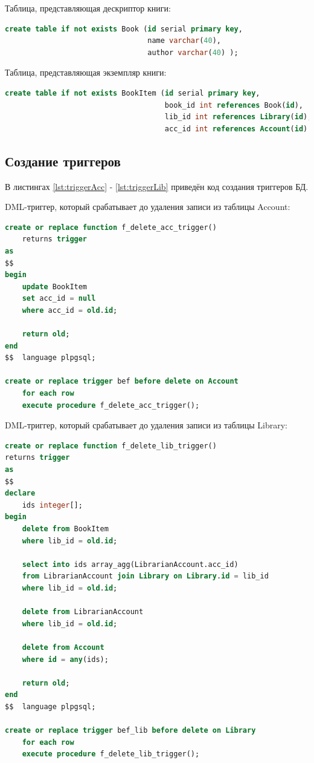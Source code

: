 Таблица, представляющая дескриптор книги:
\begin{lstlisting}[label=lst:tableBook, caption=Создание таблицы Book, language=sql]
create table if not exists Book (id serial primary key,
                                 name varchar(40),
                                 author varchar(40) );
\end{lstlisting}

Таблица, представляющая экземпляр книги:
\begin{lstlisting}[label=lst:tableBI, caption=Создание таблицы BookItem, language=sql]
create table if not exists BookItem (id serial primary key,
                                     book_id int references Book(id),
                                     lib_id int references Library(id),
                                     acc_id int references Account(id) );
\end{lstlisting}

\newpage
\subsection{Создание триггеров}
В листингах \ref{lst:triggerAcc} - \ref{lst:triggerLib} приведён код создания триггеров БД. 

\noindent DML-триггер, который срабатывает до удаления записи из таблицы Account:
\begin{lstlisting}[label=lst:triggerAcc, caption=Создание триггера (до удаления аккаунта), language=sql]
create or replace function f_delete_acc_trigger()
    returns trigger
as
$$
begin
    update BookItem
    set acc_id = null
    where acc_id = old.id;
    
    return old;
end
$$  language plpgsql;

create or replace trigger bef before delete on Account
    for each row
    execute procedure f_delete_acc_trigger();
\end{lstlisting}

\noindent DML-триггер, который срабатывает до удаления записи из таблицы Library:
\begin{lstlisting}[label=lst:triggerLib, caption=Создание триггера (до удаления библиотеки), language=sql]
create or replace function f_delete_lib_trigger()
returns trigger
as
$$
declare
    ids integer[];
begin
    delete from BookItem
    where lib_id = old.id;

    select into ids array_agg(LibrarianAccount.acc_id)
    from LibrarianAccount join Library on Library.id = lib_id
    where lib_id = old.id;

    delete from LibrarianAccount
    where lib_id = old.id;

    delete from Account
    where id = any(ids);

    return old;
end
$$  language plpgsql;

create or replace trigger bef_lib before delete on Library
    for each row
    execute procedure f_delete_lib_trigger();
\end{lstlisting}

